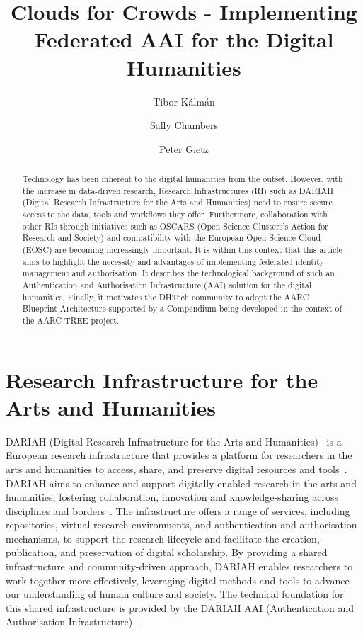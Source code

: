 \documentclass[final]{anthology-ch} %
\title{Clouds for Crowds - Implementing Federated AAI for the Digital Humanities}
\author[1]{Tibor K\'alm\'an}[
  orcid=0000-0001-5194-5053
]
\author[2]{Sally Chambers}[
  orcid=0000-0002-2430-475X
]
\author[3]{Peter Gietz}[
  orcid=0000-0002-8310-2015
]
\affiliation{1}{GWDG, G\"ottingen, Germany}
\affiliation{2}{DARIAH, Paris, France}
\affiliation{3}{DAASI International, T\"ubingen, Germany}
\begin{document}
\maketitle


\begin{abstract}
Technology has been inherent to the digital humanities from the outset. However, with the increase in data-driven research, Research Infrastructures (RI) such as DARIAH (Digital Research Infrastructure for the Arts and Humanities) need to ensure secure access to the data, tools and workflows they offer. Furthermore, collaboration with other RIs through initiatives such as OSCARS (Open Science Clusters’s Action for Research and Society) and compatibility with the European Open Science Cloud (EOSC) are becoming increasingly important. It is within this context that this article aims to highlight the necessity and advantages of implementing federated identity management and authorisation. It describes the technological background of such an Authentication and Authorisation Infrastructure (AAI) solution for the digital humanities. Finally, it motivates the DHTech community to adopt the AARC Blueprint Architecture supported by a Compendium being developed in the context of the AARC-TREE project. 
\end{abstract}



\section{Research Infrastructure for the Arts and Humanities} 

DARIAH (Digital Research Infrastructure for the Arts and Humanities)~\cite{web_dariah} is a European research infrastructure that provides a platform for researchers in the arts and humanities to access, share, and preserve digital resources and tools~\cite{sshoc_marketplace}. DARIAH aims to enhance and support digitally-enabled research in the arts and humanities, fostering collaboration, innovation and knowledge-sharing across disciplines and borders~\cite{chambers_2025_14881627}. The infrastructure offers a range of services, including repositories, virtual research environments, and authentication and authorisation mechanisms, to support the research lifecycle and facilitate the creation, publication, and preservation of digital scholarship. By providing a shared infrastructure and community-driven approach, DARIAH enables researchers to work together more effectively, leveraging digital methods and tools to advance our understanding of human culture and society. The technical foundation for this shared infrastructure is provided by the DARIAH AAI (Authentication and Authorisation Infrastructure)~.
\end{document}
